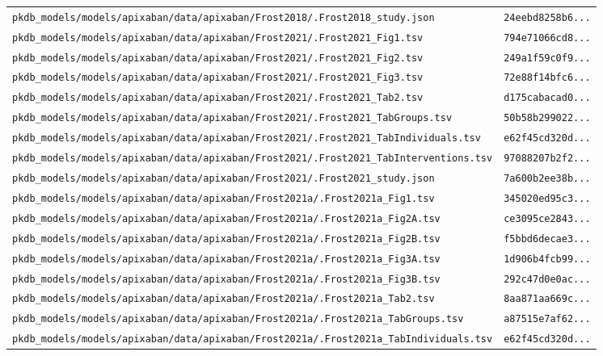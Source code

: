 \documentclass{article}
\begin{document}
\begin{longtable}{ll}
\texttt{pkdb\_models/models/apixaban/data/apixaban/Frost2018/.Frost2018\_study.json} & \texttt{24eebd8258b6...} \\
\texttt{pkdb\_models/models/apixaban/data/apixaban/Frost2021/.Frost2021\_Fig1.tsv} & \texttt{794e71066cd8...} \\
\texttt{pkdb\_models/models/apixaban/data/apixaban/Frost2021/.Frost2021\_Fig2.tsv} & \texttt{249a1f59c0f9...} \\
\texttt{pkdb\_models/models/apixaban/data/apixaban/Frost2021/.Frost2021\_Fig3.tsv} & \texttt{72e88f14bfc6...} \\
\texttt{pkdb\_models/models/apixaban/data/apixaban/Frost2021/.Frost2021\_Tab2.tsv} & \texttt{d175cabacad0...} \\
\texttt{pkdb\_models/models/apixaban/data/apixaban/Frost2021/.Frost2021\_TabGroups.tsv} & \texttt{50b58b299022...} \\
\texttt{pkdb\_models/models/apixaban/data/apixaban/Frost2021/.Frost2021\_TabIndividuals.tsv} & \texttt{e62f45cd320d...} \\
\texttt{pkdb\_models/models/apixaban/data/apixaban/Frost2021/.Frost2021\_TabInterventions.tsv} & \texttt{97088207b2f2...} \\
\texttt{pkdb\_models/models/apixaban/data/apixaban/Frost2021/.Frost2021\_study.json} & \texttt{7a600b2ee38b...} \\
\texttt{pkdb\_models/models/apixaban/data/apixaban/Frost2021a/.Frost2021a\_Fig1.tsv} & \texttt{345020ed95c3...} \\
\texttt{pkdb\_models/models/apixaban/data/apixaban/Frost2021a/.Frost2021a\_Fig2A.tsv} & \texttt{ce3095ce2843...} \\
\texttt{pkdb\_models/models/apixaban/data/apixaban/Frost2021a/.Frost2021a\_Fig2B.tsv} & \texttt{f5bbd6decae3...} \\
\texttt{pkdb\_models/models/apixaban/data/apixaban/Frost2021a/.Frost2021a\_Fig3A.tsv} & \texttt{1d906b4fcb99...} \\
\texttt{pkdb\_models/models/apixaban/data/apixaban/Frost2021a/.Frost2021a\_Fig3B.tsv} & \texttt{292c47d0e0ac...} \\
\texttt{pkdb\_models/models/apixaban/data/apixaban/Frost2021a/.Frost2021a\_Tab2.tsv} & \texttt{8aa871aa669c...} \\
\texttt{pkdb\_models/models/apixaban/data/apixaban/Frost2021a/.Frost2021a\_TabGroups.tsv} & \texttt{a87515e7af62...} \\
\texttt{pkdb\_models/models/apixaban/data/apixaban/Frost2021a/.Frost2021a\_TabIndividuals.tsv} & \texttt{e62f45cd320d...} \\

\end{longtable}
\end{document}
